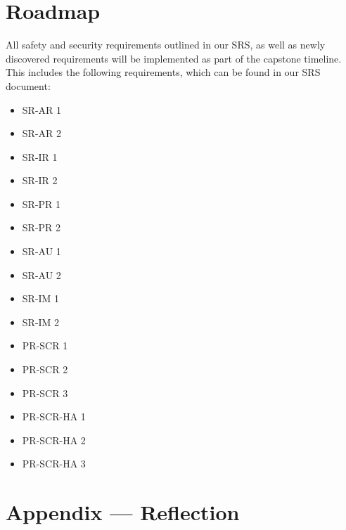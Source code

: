 \documentclass{article}
\begin{document}
\section{Roadmap}

All safety and security requirements outlined in our SRS, as well as newly discovered requirements will be implemented as part of the capstone timeline. This includes the following requirements, which can be found in our SRS document: 
\begin{multicols}{4}
\begin{itemize}
  \item SR-AR 1
  \item SR-AR 2 
  \item SR-IR 1
  \item SR-IR 2
  \item SR-PR 1
  \item SR-PR 2
  \item SR-AU 1
  \item SR-AU 2
  \item SR-IM 1
  \item SR-IM 2
  \item PR-SCR 1
  \item PR-SCR 2
  \item PR-SCR 3
  \item PR-SCR-HA 1
  \item PR-SCR-HA 2
  \item PR-SCR-HA 3
\end{itemize}
\end{multicols}
\newpage{}

\section*{Appendix --- Reflection}

\\
\end{document}
